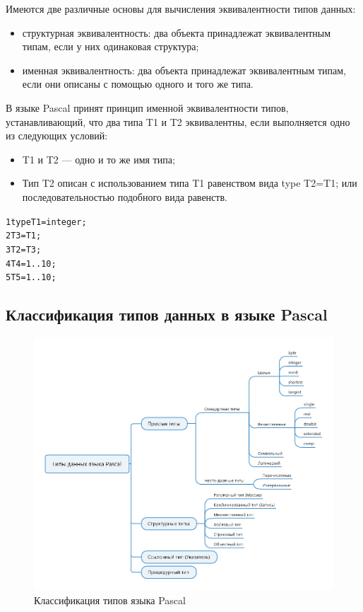 \documentclass{beamer}
\begin{document}
\begin{frame}[fragile]
Имеются две различные основы для вычисления эквивалентности типов данных:
\begin{itemize}
\item структурная эквивалентность: два объекта принадлежат эквивалентным типам, если у них одинаковая структура;
\item именная эквивалентность: два объекта принадлежат эквивалентным типам, если они описаны с помощью одного и того же типа.
\end{itemize}

В языке Pascal принят принцип именной эквивалентности типов, устанавливающий, что два типа T1 и T2 эквивалентны, если выполняется одно из следующих условий:
\begin{itemize}
\item T1 и T2 — одно и то же имя типа;
\item Тип T2 описан с использованием типа T1 равенством вида type T2=T1; или последовательностью подобного вида равенств.
\end{itemize}
\begin{alltt}
1  type T1 = integer;
2    T3 = T1;
3    T2 = T3;
4    T4 = 1..10;
5    T5 = 1..10; 	
\end{alltt}
\end{frame}   

\subsection{Классификация типов данных в языке Pascal}
\begin{frame}
\begin{figure}[h]
\centering
\includegraphics{images/tree_of_types.png}
\caption{Классификация типов языка Pascal}
\label{pic-tree-of-types}
\end{figure}
\end{frame} 
\end{document}
